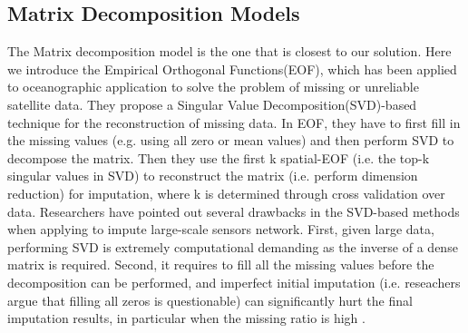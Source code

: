 \subsection{Matrix Decomposition Models}
The Matrix decomposition model is the one that is closest to our solution. Here we introduce the Empirical Orthogonal Functions(EOF), which has been applied to oceanographic application to solve the problem of missing or unreliable satellite data\cite{beckers2003eof}. 
They propose a Singular Value Decomposition(SVD)-based technique for the reconstruction of missing data. In EOF, they have to first fill in the missing values (e.g. using all zero or mean values) and then perform SVD to decompose the matrix. Then they use the first k spatial-EOF (i.e. the top-k singular values in SVD) to reconstruct the matrix (i.e. perform dimension reduction) for imputation, where k is determined through cross validation over data.
Researchers have pointed out several drawbacks in the SVD-based methods when applying to impute large-scale sensors network. First, given large data, performing SVD is extremely computational demanding as the inverse of a dense matrix is required. Second, it requires to fill all the missing values before the decomposition can be performed, and imperfect initial imputation (i.e. reseachers argue that filling all zeros is questionable) can significantly hurt the final imputation results, in particular when the missing ratio is high \cite{koren2009matrix}\cite{ke2005robust}. 

  
